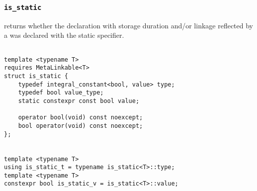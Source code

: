 
\subsubsection{\texttt{is\_static}}

returns whether the declaration with storage duration and/or linkage reflected by a  was declared with the static specifier.

\begin{verbatim}

template <typename T>
requires MetaLinkable<T>
struct is_static {
	typedef integral_constant<bool, value> type;
	typedef bool value_type;
	static constexpr const bool value;

	operator bool(void) const noexcept;
	bool operator(void) const noexcept;
};


template <typename T>
using is_static_t = typename is_static<T>::type;
template <typename T>
constexpr bool is_static_v = is_static<T>::value;

\end{verbatim}
